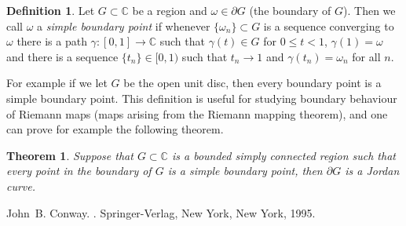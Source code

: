 \documentclass[12pt]{article}
\theoremstyle{theorem}
\newtheorem*{thm}{Theorem}
\theoremstyle{definition}
\newtheorem*{defn}{Definition}
\begin{document}
\begin{defn}
Let $G \subset {\mathbb{C}}$ be a region and $\omega \in \partial G$ (the boundary of $G$).  Then
we call $\omega$ a {\em simple boundary point} if whenever
$\{ \omega_n \} \subset G$ is a sequence converging to $\omega$ there is a path
$\gamma \colon [0,1] \to {\mathbb{C}}$ such that
$\gamma(t) \in G$ for $0 \leq t < 1$, $\gamma(1) = \omega$ and there is a sequence
$\{ t_n \} \in [0,1)$ such that $t_n \to 1$ and $\gamma(t_n) = \omega_n$ for all
$n$.
\end{defn}

For example if we let $G$ be the open unit disc, then every boundary point is a simple boundary point.  This definition is useful for studying boundary behaviour of Riemann maps (maps arising from the Riemann mapping theorem), and one can prove for example the following theorem.

\begin{thm}
Suppose that $G \subset {\mathbb{C}}$ is a bounded simply connected region such
that every point in the boundary of $G$ is a simple boundary point, then $\partial G$ is a Jordan curve.
\end{thm}

\begin{thebibliography}{9}
John~B. Conway.
{\em {}}.
Springer-Verlag, New York, New York, 1995.
\end{thebibliography}
\end{document}
